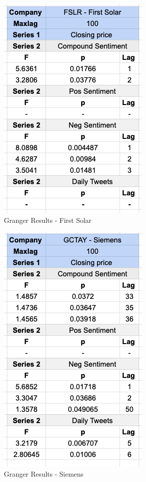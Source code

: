 \documentclass[sigconf, nonacm]{acmart}
\begin{document}
\begin{figure}[H]
  \centering
  \includegraphics[width=0.7\linewidth]{granger_results/granger_first_solar.png}
  \caption{Granger Results - First Solar}
  \label{granger_first_solar}
\end{figure}

\begin{figure}[H]
  \centering
  \includegraphics[width=0.7\linewidth]{granger_results/granger_siemens.png}
  \caption{Granger Results - Siemens}
  \label{granger_siemens}
\end{figure}
\end{document}
